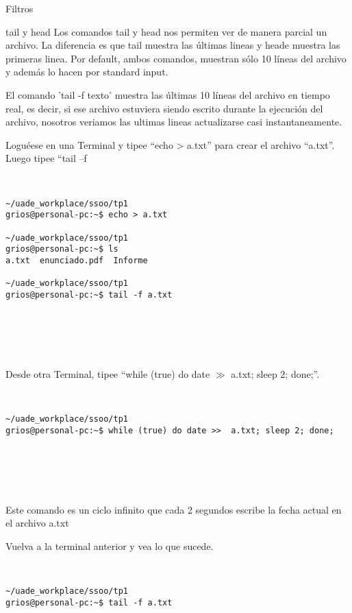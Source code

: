\begin{section}{Filtros}
\begin{subsection}{tail y head}
Los comandos tail y head nos permiten ver de manera parcial un archivo. La diferencia es que tail muestra las últimas lineas y heade muestra las primeras linea.
Por default, ambos comandos, muestran sólo 10 líneas del archivo y además lo hacen por standard input.

El comando 'tail -f texto' muestra las últimas 10 líneas del archivo en tiempo real, es decir, si ese archivo estuviera siendo escrito durante la ejecución del archivo, nosotros veriamos las ultimas lineas actualizarse casi instantaneamente.

\begin{quoting}
Loguéese en una Terminal y tipee “echo > a.txt” para crear el archivo “a.txt”. Luego tipee “tail –f
\end{quoting}\\

\begin{lstlisting}[style=Ubuntu]
~/uade_workplace/ssoo/tp1
grios@personal-pc:~$ echo > a.txt

~/uade_workplace/ssoo/tp1
grios@personal-pc:~$ ls
a.txt  enunciado.pdf  Informe

~/uade_workplace/ssoo/tp1
grios@personal-pc:~$ tail -f a.txt






\end{lstlisting}

\begin{quoting}
Desde otra Terminal, tipee “while (true) do date $\gg$ a.txt; sleep 2; done;”.
\end{quoting}\\

\begin{lstlisting}[style=Ubuntu]
~/uade_workplace/ssoo/tp1
grios@personal-pc:~$ while (true) do date >>  a.txt; sleep 2; done;






\end{lstlisting}
Este comando es un ciclo infinito que cada 2 segundos escribe la fecha actual en el archivo a.txt

\begin{quoting}
Vuelva a la terminal anterior y vea lo que sucede.
\end{quoting}\\

\begin{lstlisting}[style=Ubuntu]
~/uade_workplace/ssoo/tp1
grios@personal-pc:~$ tail -f a.txt


\end{lstlisting}
\end{subsection}
\end{section}
